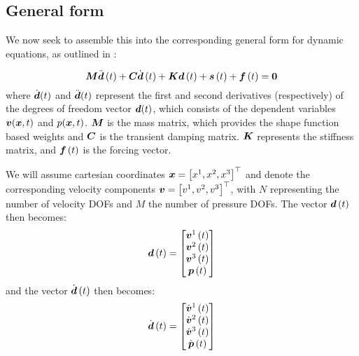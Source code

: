 \subsection{General form}

We now seek to assemble this into the corresponding general form for
dynamic equations, as outlined in :

\begin{equation}
  \matr{M}\fnof{\ddot{\vectr{d}}}{t}+\matr{C}\fnof{\dot{\vectr{d}}}{t}+\matr{K}\fnof{\vectr{d}}{t}+
  \fnof{\vectr{s}}{t}+\fnof{\vectr{f}}{t}=\vectr{0}
  \label{eqn:SEGeneralDynamic}
\end{equation}
where $\dot{ \boldsymbol{d} }(t)$ and $\ddot{ \boldsymbol{d} }(t)$ represent the first and
second derivatives (respectively) of the degrees of freedom vector
$ \boldsymbol{d} (t)$, which consists of the dependent variables
$ \boldsymbol{v} ( \boldsymbol{x} ,t)$ and $p( \boldsymbol{x} ,t)$. $\matr{M}$ is the mass matrix, which
provides the shape function based weights and $\matr{C}$ is the transient
damping matrix. $\matr{K}$ represents the stiffness matrix, and $  \boldsymbol{f} \left( t \right) $ is the forcing vector.

We will assume cartesian coordinates $ \boldsymbol{x} = {\left[ x^{1},x^{2},x^{3} \right]}^{ \top } $ and denote the
corresponding velocity components $ \boldsymbol{v} = {\left[ v^{1},v^{2},v^{3} \right]}^{ \top } $, with $N$
representing the number of velocity DOFs and $M$ the number of pressure
DOFs. The vector $  \boldsymbol{d} \left( t \right) $ then becomes:
\begin{equation}
    \boldsymbol{d} \left( t \right) =\begin{bmatrix}
    \boldsymbol{v} ^{1}\left( t \right)  \\
    \boldsymbol{v} ^{2}\left( t \right)  \\
    \boldsymbol{v} ^{3}\left( t \right)  \\
    \boldsymbol{p} \left( t \right) 
  \end{bmatrix}
\end{equation}
and the vector $ \dot{ \boldsymbol{d} }\left( t \right) $ then becomes:
\begin{equation}
   \dot{ \boldsymbol{d} }\left( t \right) =\begin{bmatrix}
   \dot{ \boldsymbol{v} }^{1}\left( t \right)  \\
   \dot{ \boldsymbol{v} }^{2}\left( t \right)  \\
   \dot{ \boldsymbol{v} }^{3}\left( t \right)  \\
   \dot{ \boldsymbol{p} }\left( t \right) 
  \end{bmatrix}
\end{equation}

